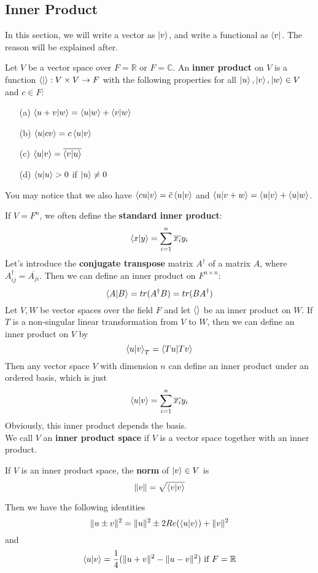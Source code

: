 \documentclass{article}
\begin{document}
\subsection{Inner Product}
In this section, we will write a vector as $\ket{v}$, and write a functional as $\bra{v}$. The reason will be explained after.
\begin{dde}
	Let $V$ be a vector space over $F=\mathbb{R}$ or $F=\mathbb{C}$. An \textbf{inner product} on $V$ is a function $\braket{ | }:V\times V\rightarrow F$ with the following properties for all $\ket{u},\ket{v},\ket{w}\in V$ and $c\in F$:
	\begin{enumerate}
		\item [(a)]$\braket{u+v|w}=\braket{u|w}+\braket{v|w}$
		\item [(b)]$\braket{u|cv}=c\braket{u|v}$
		\item [(c)]$\braket{u|v}=\overline{\braket{v|u}}$
		\item [(d)]$\braket{u|u}>0$ if $\ket{u}\neq0$
	\end{enumerate}
	You may notice that we also have $\braket{cu|v}=\bar{c}\braket{u|v}$ and $\braket{u|v+w}=\braket{u|v}+\braket{u|w}$.
\end{dde}
If $V=F^n$, we often define the \textbf{standard inner product}:
\[\braket{x|y}=\sum_{i=1}^{n}\overline{x_i}y_i\]
\indent Let's introduce the \textbf{conjugate transpose} matrix $A^\dagger$ of a matrix $A$, where $A^\dagger_{ij}=\overline{A_{ji}}$. Then we can define an inner product on $F^{n\times n}$:
\[\braket{A|B}=tr(A^\dagger B)=tr(BA^\dagger)\]
\indent Let $V,W$ be vector spaces over the field $F$ and let $\braket{}$ be an inner product on $W$. If $T$ is a non-singular linear transformation from $V$ to $W$, then we can define an inner product on $V$ by
\[\braket{u|v}_T=\braket{Tu|Tv}\]
Then any vector space $V$ with dimension $n$ can define an inner product under an ordered basis, which is just
\[\braket{u|v}=\sum_{i=1}^n\overline{x_i}y_i\]
Obviously, this inner product depends the basis.\\
\indent We call $V$ an \textbf{inner product space} if $V$ is a vector space together with an inner product.
\begin{dde}
	If $V$ is an inner product space, the \textbf{norm} of $\ket{v}\in V$ is 
	\[\Vert v \Vert=\sqrt{\braket{v|v}}\]
\end{dde}
Then we have the following identities
\[\Vert u\pm v\Vert^2=\Vert u\Vert^2\pm2Re(\braket{u|v})+\Vert v\Vert^2\]
and
\[\braket{u|v}=\frac{1}{4}(\Vert u+v\Vert^2-\Vert u-v\Vert^2)\text{ if }F=\mathbb{R}\]
\end{document}
